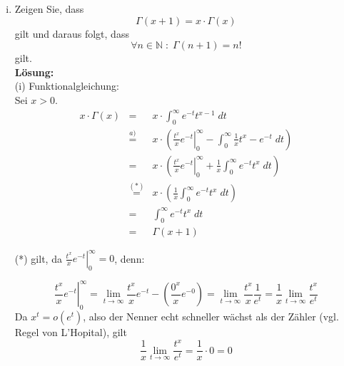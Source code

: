 \documentclass[11pt,a4paper,ngerman]{article}
\begin{document}
\begin{enumerate}[(i)]
    (i) Erster Term\\
    Wegen $t > 0 \Rightarrow e^{-t} t^{x-1} < t^{x-1}$. Also gilt:
    $$
      \lim_{a \to 0^{+}}{\int_{a}^{1}{e^{-t} t^{x-1} \; dt}}
    < \lim_{a \to 0^{+}}{\int_{a}^{1}{t^{x-1} \; dt}}
    = \frac{1}{x} 1^x -  \lim_{a \to 0^{+}}{\frac{1}{x} a^x}
    = \frac{1}{x} < \infty
    $$
    Also konvergiert $\lim_{a \to 0^{+}}{\int_{a}^{1}{e^{-t} t^{x-1} \; dt}}$.
    
    (ii) Zweiter Term\\
    Da $t \geq 1$ ex. für $a > 0$ ein $c > 0$, s.d. für $0 < x \leq a$ gilt: $t^{x-1} < c \cdot e^{\frac{t}{2}}$. Also gilt:\\
    $$
     \lim_{b \to \infty}{\int_{1}^{b}{e^{-t} t^{x-1} \; dt}} \leq \lim_{b \to \infty}{c \int_{1}^{b}{e^{-\frac{t}{2}} \; dt}} < \infty
    $$
    Also konvergiert $\lim_{b \to \infty}{\int_{1}^{b}{e^{-t} t^{x-1} \; dt}}$.
    
    
	\item Zeigen Sie, dass
		$$
			\Gamma (x+1) = x \cdot \Gamma (x)
		$$
		gilt und daraus folgt, dass
		$$
			\forall n \in \mathbb{N} \; : \;\Gamma (n+1) = n!
		$$
		gilt.\\

		\textbf{Lösung:}\\
        (i) Funktionalgleichung: \\ 

		Sei $x > 0$.
        \begin{eqnarray*}
        x \cdot \Gamma(x) & = & x \cdot \int_{0}^{\infty}{e^{-t} t^{x-1} \; dt} \\
        &\stackrel{a)}{=}& x \cdot \left( \left. \frac{t^x}{x} e^{-t} \right|_{0}^{\infty} 
                           - \int_{0}^{\infty}{\frac{1}{x} t^x -e^{-t} \; dt} \right) \\
        &=& x \cdot \left( \left. \frac{t^x}{x} e^{-t} \right|_{0}^{\infty} 
                           + \frac{1}{x} \int_{0}^{\infty}{e^{-t} t^x \; dt} \right) \\
        &\stackrel{(*)}{=}& x \cdot \left( \frac{1}{x} \int_{0}^{\infty}{e^{-t} t^x \; dt} \right)  \\
        &=& \int_{0}^{\infty}{e^{-t} t^x \; dt} \\
        &=& \Gamma(x+1)
        \end{eqnarray*}

        (*) gilt, da $ \left. \frac{t^x}{x} e^{-t} \right|_{0}^{\infty} = 0 $, denn:
        
        $$
          \left. \frac{t^x}{x} e^{-t} \right|_{0}^{\infty}
        = \lim_{t \to \infty}{\frac{t^x}{x} e^{-t}} - (\frac{0^x}{x} e^{-0}) 
        = \lim_{t \to \infty}{\frac{t^x}{x} \frac{1}{e^t}}
        = \frac{1}{x} \lim_{t \to \infty}{\frac{t^x}{e^t}}
        $$
        Da $x^t = o(e^t)$, also der Nenner echt schneller wächst als der Zähler (vgl. Regel von L'Hopital), gilt
        $$
          \frac{1}{x} \lim_{t \to \infty}{\frac{t^x}{e^t}}
        = \frac{1}{x} \cdot 0 = 0
        $$


\end{enumerate}
\end{document}
